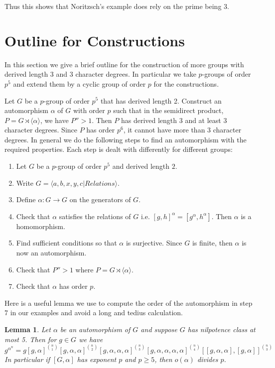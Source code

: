 \documentclass[]{amsart}
\newtheorem{lemma}[theorem]{Lemma}
\theoremstyle{definition}
\theoremstyle{definition}
\theoremstyle{definition}
\theoremstyle{definition}
\theoremstyle{remark}
\theoremstyle{remark}
\begin{document}
        Thus this shows that Noritzsch's example does rely on the prime being $3$. 

        

    \section{Outline for Constructions}

        In this section we give a brief outline for the construction of more groups with derived length 3 and 3 character degrees. In particular we take $p$-groups of order $p^5$ and extend them by a cyclic group of order $p$ for the constructions. 
        
        Let $G$ be a $p$-group of order $p^5$ that has derived length 2. Construct an automorphism $\alpha$ of $G$ with order $p$ such that in the semidirect product, $P=G\rtimes \langle \alpha \rangle$, we have $P''>1$. Then $P$ has derived length 3 and at least 3 character degrees. Since $P$ has order $p^6$, it cannot have more than 3 character degrees. In general we do the following steps to find an automorphism with the required properties. Each step is dealt with differently for different groups:

        \begin{enumerate}
            \item Let $G$ be a $p$-group of order $p^5$ and derived length $2$. 
            \item Write $G=\langle a,b,x,y,c | Relations \rangle$. 
            \item Define $\alpha:G\to G$ on the generators of $G$.
            \item Check that $\alpha$ satisfies the relations of $G$ i.e. $[g,h]^{\alpha}=[g^{\alpha},h^{\alpha}]$. Then $\alpha$ is a homomorphism.
            \item Find sufficient conditions so that $\alpha$ is surjective. Since $G$ is finite, then $\alpha$ is now an automorphism.
            \item Check that $P''>1$ where $P=G\rtimes \langle \alpha \rangle$.
            \item Check that $\alpha$ has order $p$. 
        \end{enumerate}

        Here is a useful lemma we use to compute the order of the automorphism in step 7 in our examples and avoid a long and tedius calculation.

        \begin{lemma}
            Let $\alpha$ be an automorphism of $G$ and suppose $G$ has nilpotence class at most 5. Then for $g\in G$ we have
            \[
                g^{\alpha^n}=g[g,\alpha]^{\binom{n}{1}}[g,\alpha,\alpha]^{\binom{n}{2}} [g,\alpha,\alpha,\alpha]^{\binom{n}{3}} [g,\alpha,\alpha,\alpha,\alpha]^{\binom{n}{4}} [[g,\alpha,\alpha],[g,\alpha]]^{\binom{n}{3}}
            \]  
            In particular if $[G,\alpha]$ has exponent $p$ and $p\geq 5$, then $o(\alpha)$ divides $p$.
        \end{lemma}
\end{document}
